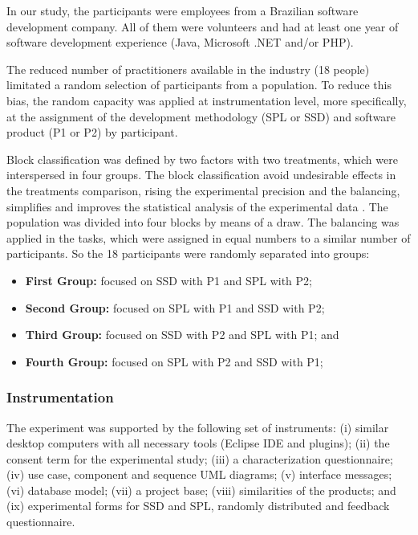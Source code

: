 In our study, the participants were employees from a Brazilian software development company. All of them were volunteers and had at least one year of software development experience (Java, Microsoft .NET and/or PHP).


The reduced number of practitioners available in the industry (18 people) limitated a random selection of participants from a population. To reduce this bias, the random capacity was applied at instrumentation level, more specifically, at the assignment of the development methodology (SPL or SSD) and software product (P1 or P2) by participant. 


Block classification was defined by two factors with two treatments, which were interspersed in four groups. The block classification avoid undesirable effects in the treatments comparison, rising the experimental precision and the balancing, simplifies and improves the statistical analysis of the experimental data \cite{brooks96}. The population was divided into four blocks by means of a draw. The balancing was applied in the tasks, which were assigned in equal numbers to a similar number of participants. So the 18 participants were randomly separated into groups:

\begin{itemize}
\item \textbf{First Group:} focused on SSD with P1 and SPL with P2;

\item \textbf{Second Group:} focused on SPL with P1 and SSD with P2;

\item \textbf{Third Group:} focused on SSD with P2 and SPL with P1; and

\item \textbf{Fourth Group:} focused on SPL with P2 and SSD with P1;
\end{itemize}

\subsubsection*{Instrumentation}

The experiment was supported by the following set of instruments: (i) similar desktop computers with all necessary tools (Eclipse IDE and plugins); (ii) the consent term for the experimental study; (iii) a characterization questionnaire; (iv) use case, component and sequence UML diagrams; (v) interface messages; (vi) database model; (vii) a project base; (viii) similarities of the products; and (ix) experimental forms for SSD and SPL, randomly distributed and feedback questionnaire.

